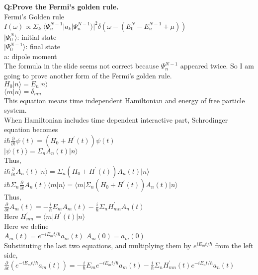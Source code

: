 \documentclass{article}
\begin{document}
\newpage
\noindent \textbf{Q:Prove the Fermi's golden rule.}\\
\noindent Fermi's Golden rule\\
\noindent $I(\omega)\propto\Sigma_k\lvert\langle\Psi_n^{N-1}|a_k|\Psi_n^{N-1}\rangle\rvert^2\delta(\omega-(E_0^N-E_n^{N-1}+\mu))$\\
\noindent $\lvert\Psi_0^N\rangle$: initial state\\
\noindent $\lvert\Psi_0^{N-1}\rangle$: final state\\
\noindent a: dipole moment\\
\noindent The formula in the slide seems not correct because $\Psi_n^{N-1}$ appeared twice.
\noindent So I am going to prove another form of the Fermi's golden rule. \\
\noindent $H_0\lvert n\rangle=E_n\lvert n\rangle$\\
\noindent $\langle m|n\rangle=\delta_{mn}$\\
\noindent This equation means time independent Hamiltonian and energy of free particle system.\\
\noindent When Hamiltonian includes time dependent interactive part, Schrodinger equation becomes\\
\noindent $i\hbar\frac{\partial}{\partial t}\psi(t)=(H_0+H^{'}(t))\psi(t)$\\
\noindent $\lvert \psi(t)\rangle=\Sigma_nA_n(t)\lvert n\rangle$\\
\noindent Thus,\\
\noindent $i\hbar\frac{\partial}{\partial t}A_n(t)\lvert n\rangle=\Sigma_n(H_0+H^{'}(t))A_n(t)\lvert n\rangle$\\
\noindent $i\hbar\Sigma_n\frac{\partial}{\partial t}A_n(t)\langle m\lvert n\rangle=\langle m\lvert \Sigma_n(H_0+H^{'}(t))A_n(t)\rvert n\rangle$\\
\noindent Thus,\\
\noindent $\frac{\partial}{\partial t}A_m(t)=-\frac{i}{\hbar}E_mA_m(t)-\frac{i}{\hbar}\Sigma_nH^{'}_{mn}A_n(t)$\\
\noindent Here $H^{'}_{mn}=\langle m\lvert H^{'}(t)\rvert n\rangle$\\
\noindent Here we define\\
\noindent $A_m(t)=e^{-iE_mt/\hbar}a_m(t)$ $A_m(0)=a_m(0)$\\
\noindent Substituting the last two equations, and multiplying them by $e^{iE_mt/\hbar}$ from the left side,\\
\noindent $\frac{\partial}{\partial t}(e^{-iE_mt/\hbar}a_m(t))=-\frac{i}{\hbar}E_me^{-iE_mt/\hbar}a_m(t)-\frac{i}{\hbar}\Sigma_{n}H^{'}_{mn}(t)e^{-iE_nt/\hbar}a_n(t)$\\
\end{document}
